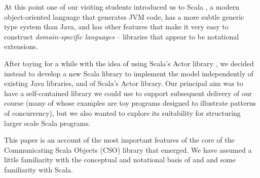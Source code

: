 \documentclass[12pt]{IOS-Book-Article-CPA-2017}
\begin{document}
At this point one of our visiting students introduced us to
Scala \cite{scala}, a modern object-oriented language that
generates JVM code, has a more subtle generic type system than 
Java, and has other features that make it very easy to construct
\textit{domain-specific languages} -- libraries that appear to be notational extensions.

After toying for a while with the idea of using Scala's Actor library
\cite{actors1,actors2}, we decided instead to develop a new Scala
library to implement the \occam model independently of existing
Java libraries, and of
Scala's Actor library.
%
Our principal aim was to have a self-contained library we
could use to support subsequent delivery of our course (many
of whose examples are toy programs designed to illustrate
patterns of concurrency), but we also wanted to explore its
suitability for structuring larger scale Scala programs.

This paper is an account of the most important features of the core of 
the Communicating Scala Objects (CSO) library that emerged. We have assumed a little
familiarity with the conceptual and notational basis of \occam and
and some familiarity with Scala.



\begin{comment}
Readers familiar with JCSP and Scala may be able to get a quick initial 
impression of the relative notational weights of Scala+CSO and Java+JCSP 
by inspecting the definitions of \textsc{FairPlex} multiplexer components
defined on pages \pageref{scalafairplex} 
and \pageref{javafairplex} respectively. 
\end{comment}


\end{document}

